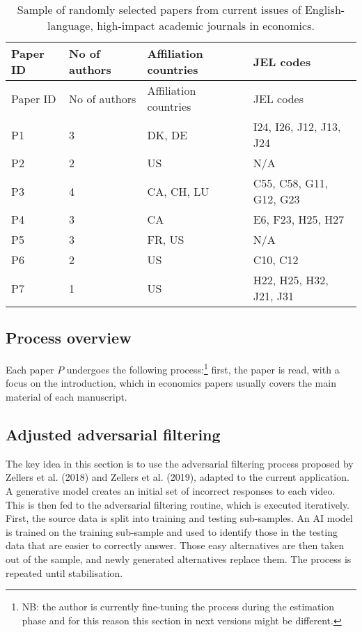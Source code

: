\documentclass[
]{article}
\theoremstyle{plain}
\theoremstyle{definition}
\theoremstyle{remark}
\begin{document}
\begin{longtable}[]{@{}llll@{}}
\caption{Sample of randomly selected papers from current issues of
English-language, high-impact academic journals in
economics.}\label{tbl-papers}\tabularnewline
\toprule\noalign{}
Paper ID & No of authors & Affiliation countries & JEL codes \\
\midrule\noalign{}
\endfirsthead
\toprule\noalign{}
Paper ID & No of authors & Affiliation countries & JEL codes \\
\midrule\noalign{}
\endhead
\bottomrule\noalign{}
\endlastfoot
P1 & 3 & DK, DE & I24, I26, J12, J13, J24 \\
P2 & 2 & US & N/A \\
P3 & 4 & CA, CH, LU & C55, C58, G11, G12, G23 \\
P4 & 3 & CA & E6, F23, H25, H27 \\
P5 & 3 & FR, US & N/A \\
P6 & 2 & US & C10, C12 \\
P7 & 1 & US & H22, H25, H32, J21, J31 \\
\end{longtable}

\subsection{Process overview}\label{process-overview}

Each paper \(P\) undergoes the following process:\footnote{NB: the
  author is currently fine-tuning the process during the estimation
  phase and for this reason this section in next versions might be
  different.} first, the paper is read, with a focus on the
introduction, which in economics papers usually covers the main material
of each manuscript.

\subsection{Adjusted adversarial
filtering}\label{adjusted-adversarial-filtering}

The key idea in this section is to use the adversarial filtering process
proposed by Zellers et al. (2018) and Zellers et al. (2019), adapted to
the current application. A generative model creates an initial set of
incorrect responses to each video. This is then fed to the adversarial
filtering routine, which is executed iteratively. First, the source data
is split into training and testing sub-samples. An AI model is trained
on the training sub-sample and used to identify those in the testing
data that are easier to correctly answer. Those easy alternatives are
then taken out of the sample, and newly generated alternatives replace
them. The process is repeated until stabilisation.
\end{document}
